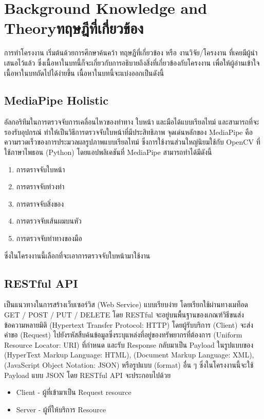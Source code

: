 \chapter{\ifenglish Background Knowledge and Theory\else ทฤษฎีที่เกี่ยวข้อง\fi}

การทำโครงงาน เริ่มต้นด้วยการศึกษาค้นคว้า ทฤษฎีที่เกี่ยวข้อง หรือ งานวิจัย/โครงงาน ที่เคยมีผู้นำเสนอไว้แล้ว ซึ่งเนื้อหาในบทนี้ก็จะเกี่ยวกับการอธิบายถึงสิ่งที่เกี่ยวข้องกับโครงงาน 
เพื่อให้ผู้อ่านเข้าใจเนื้อหาในบทถัดไปได้ง่ายขึ้น เนื้อหาในบทนี้จะแบ่งออกเป็นดังนี้

\section{MediaPipe Holistic}
อัลกอริทึมในการตรวจจับการเคลื่อนไหวของท่าทาง ใบหน้า และมือได้แบบเรียลไทม์ และสามารถที่จะรองรับอุปกรณ์
ทำให้เป็นวิธีการตรวจจับใบหน้าที่มีประสิทธิภาพ จุดเด่นหลักของ MediaPipe คือความรวดเร็วของการประมวลผลรูปภาพแบบเรียลไทม์
ซึ่งการใช้งานส่วนใหญ่นิยมใช้กับ OpenCV ที่ใช้ภาษาไพธอน (Python) \cite{Mediapipe} โดยแอปพลิเคชันที่ MediaPipe สามารถทำได้มีดังนี้
\begin{enumerate}
  \item การตราจจับใบหน้า
  \item การตราจจับท่วงท่า
  \item การตราจจับสิ่งของ
  \item การตรวจจับเส้นผมบนหัว
  \item การตรวจจับท่าทางของมือ
\end{enumerate}
ซึ่งในโครงงานนี้เลือกที่จะเอาการตรวจจับใบหน้ามาใช้งาน

\section{RESTful API}
เป็นแนวทางในการสร้างเว็บเซอร์วิส (Web Service) แบบเรียบง่าย โดยเรียกใช้ผ่านทางเมท็อด GET / POST / PUT / DELETE
โดย RESTful จะอยู่บนพื้นฐานของเกณฑ์วิธีขนส่งข้อความหลายมิติ (Hypertext Transfer Protocol: HTTP) โดยผู้รับบริการ (Client) จะส่ง
คำขอ (Request) ไปยังรหัสสืบค้นข้อมูลซึ่งระบุแหล่งที่อยู่ของทรัพยากรที่ต้องการ (Uniform Resource Locator: URI) ที่กำหนด และรับ Response กลับมาเป็น Payload 
ในรูปแบบของ (HyperText Markup Language: HTML), (Document Markup Language: XML), (JavaScript Object Notation: JSON) หรือรูปแบบ (format) อื่น ๆ \cite{REST}
ซึ่งในโครงงานนี้จะใช้ Payload แบบ JSON โดย RESTful API จะประกอบไปด้วย
\begin{itemize}
  \item Client - ผู้ที่เข้ามาเป็น Request resource
  \item Server - ผู้ที่ให้บริการ Resource
\end{itemize}
\cleardoublepage


